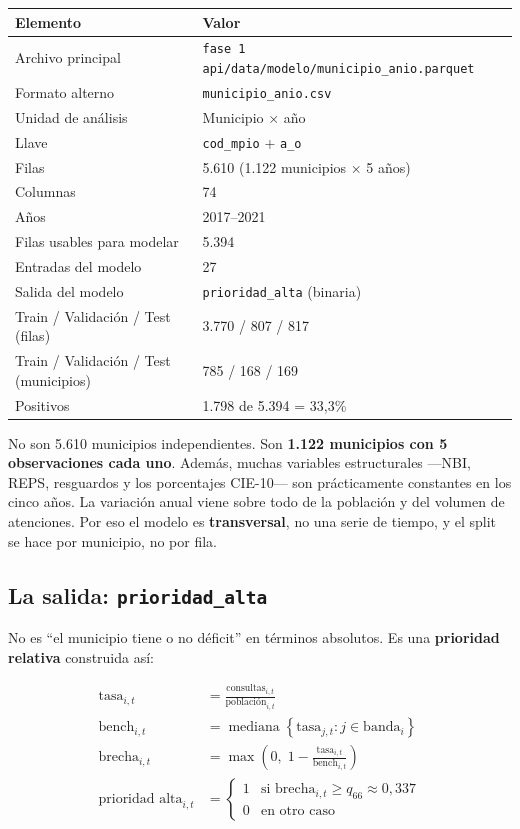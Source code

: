 \documentclass[11pt,a4paper]{article}
\newcommand{\code}[1]{\texttt{#1}}
\begin{document}
\begin{table}[H]
\centering
\small
\begin{tabularx}{\textwidth}{@{}L{4.2cm} Y@{}}
\toprule
\textbf{Elemento} & \textbf{Valor} \\
\midrule
Archivo principal & \code{fase 1 api/data/modelo/municipio_anio.parquet} \\
Formato alterno & \code{municipio_anio.csv} \\
Unidad de análisis & Municipio $\times$ año \\
Llave & \code{cod_mpio} + \code{a_o} \\
Filas & 5.610 (1.122 municipios $\times$ 5 años) \\
Columnas & 74 \\
Años & 2017--2021 \\
Filas usables para modelar & 5.394 \\
Entradas del modelo & 27 \\
Salida del modelo & \code{prioridad_alta} (binaria) \\
Train / Validación / Test (filas) & 3.770 / 807 / 817 \\
Train / Validación / Test (municipios) & 785 / 168 / 169 \\
Positivos & 1.798 de 5.394 = 33,3\% \\
\bottomrule
\end{tabularx}
\end{table}

\begin{tcolorbox}[ojo,title={La advertencia más importante}]
No son 5.610 municipios independientes. Son \textbf{1.122 municipios con 5 observaciones cada uno}. Además, muchas variables estructurales ---NBI, REPS, resguardos y los porcentajes CIE-10--- son prácticamente constantes en los cinco años. La variación anual viene sobre todo de la población y del volumen de atenciones. Por eso el modelo es \textbf{transversal}, no una serie de tiempo, y el split se hace por municipio, no por fila.
\end{tcolorbox}

\subsection{La salida: \code{prioridad_alta}}

No es ``el municipio tiene o no déficit'' en términos absolutos. Es una \textbf{prioridad relativa} construida así:

\begin{align}
\text{tasa}_{i,t} &= \frac{\text{consultas}_{i,t}}{\text{población}_{i,t}} \\
\text{bench}_{i,t} &= \operatorname{mediana}\left\{\text{tasa}_{j,t} : j \in \text{banda}_i\right\} \\
\text{brecha}_{i,t} &= \max\left(0,\; 1 - \frac{\text{tasa}_{i,t}}{\text{bench}_{i,t}}\right) \\
\text{prioridad alta}_{i,t} &=
\begin{cases}
1 & \text{si } \text{brecha}_{i,t} \ge q_{66} \approx 0{,}337 \\
0 & \text{en otro caso}
\end{cases}
\end{align}
\end{document}
